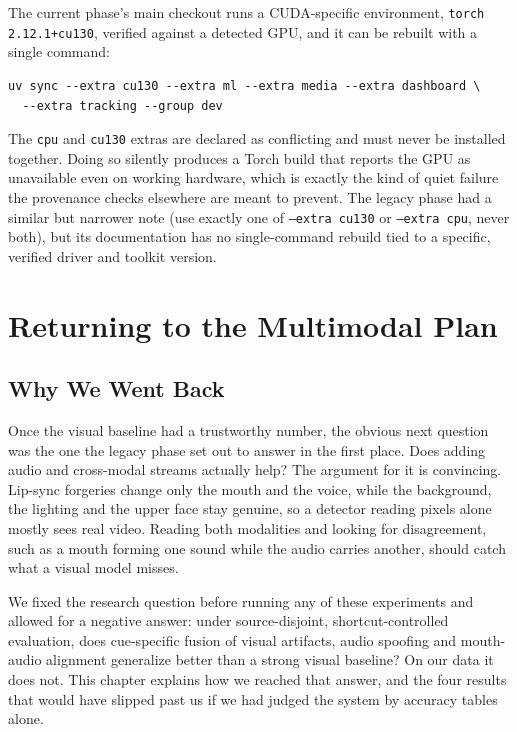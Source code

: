 The current phase's main checkout runs a CUDA-specific environment,
\texttt{torch 2.12.1+cu130}, verified against a detected GPU, and it can be
rebuilt with a single command:

\begin{verbatim}
uv sync --extra cu130 --extra ml --extra media --extra dashboard \
  --extra tracking --group dev
\end{verbatim}

The \texttt{cpu} and \texttt{cu130} extras are declared as conflicting and must
never be installed together. Doing so silently produces a Torch build that
reports the GPU as unavailable even on working hardware, which is exactly the
kind of quiet failure the provenance checks elsewhere are meant to prevent. The
legacy phase had a similar but narrower note (use exactly one of
\texttt{--extra cu130} or \texttt{--extra cpu}, never both), but its
documentation has no single-command rebuild tied to a specific, verified driver
and toolkit version.

\chapter{Returning to the Multimodal Plan}
\label{ch:multimodal}

\section{Why We Went Back}

Once the visual baseline had a trustworthy number, the obvious next question
was the one the legacy phase set out to answer in the first place. Does adding
audio and cross-modal streams actually help? The argument for it is
convincing. Lip-sync forgeries change only the mouth and the voice, while the
background, the lighting and the upper face stay genuine, so a detector reading
pixels alone mostly sees real video. Reading both modalities and looking for
disagreement, such as a mouth forming one sound while the audio carries
another, should catch what a visual model misses.

We fixed the research question before running any of these experiments and
allowed for a negative answer: under source-disjoint, shortcut-controlled
evaluation, does cue-specific fusion of visual artifacts, audio spoofing and
mouth-audio alignment generalize better than a strong visual baseline? On our
data it does not. This chapter explains how we reached that answer, and the
four results that would have slipped past us if we had judged the system by
accuracy tables alone.

